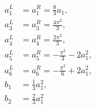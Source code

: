 \begin{equation}\begin{split}
a_1^L&=a_1^R=\frac8{3}a_1,\\
a_3^L&=a_3^R=\frac{4\pi^2}3,\\
a_4^L&=a_4^R=\frac{2\pi^2}3,\\
a_5^L&=a_5^R=-\frac{\pi^2}{3}-2a_1^2,\\
a_6^L&=a_6^R=-\frac{\pi^2}{6}+2a_1^2,\\
b_1&=\frac{1}{3}a_1^2,\\
b_2&=\frac{2}{3}a_1^2
\end{split}\end{equation}

